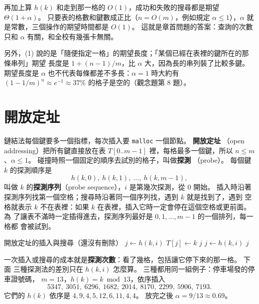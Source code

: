再加上算 $h(k)$ 和走到那一格的 $O(1)$，成功和失敗的搜尋都是期望 $\Theta(1 +
\alpha)$。 只要表的格數和鍵數成正比（$n = O(m)$，例如規定 $\alpha \le 1$），$\alpha$
就是常數，三個操作的期望時間都是 $O(1)$。 這就是章首問題的答案：查詢的次數只和
$\alpha$ 有關，和全校有幾張卡無關。

另外，(1) 說的是「隨便指定一格」的期望長度；「某個已經在表裡的鍵所在的那條串列」期望
長度是 $1 + (n-1)/m$，比 $\alpha$ 大，因為長的串列裝了比較多鍵。 期望長度是
$\alpha$ 也不代表每條都差不多長：$\alpha = 1$ 時大約有 $(1 - 1/m)^n \approx e^{-1}
\approx 37\%$ 的格子是空的（觀念題第 8 題）。

\section{開放定址}
\label{sec:hash-open}

鏈結法每個鍵要多一個指標，每次插入要 \texttt{malloc} 一個節點。 \textbf{開放定址}
（open addressing）把所有鍵直接放在表 $T[0..m-1]$ 裡，每格最多一個鍵，所以
$n \le m$、$\alpha \le 1$。 碰撞時照一個固定的順序去試別的格子，叫做\textbf{探測}
（probe）。 每個鍵 $k$ 的探測順序是
\[
h(k, 0),\ h(k, 1),\ \ldots,\ h(k, m - 1),
\]
叫做 $k$ 的\textbf{探測序列}（probe sequence），$i$ 是第幾次探測，從 $0$ 開始。
插入時沿著探測序列找第一個空格；搜尋時沿著同一個序列找，遇到 $k$ 就是找到了，遇到
空格就表示 $k$ 不在表裡：如果 $k$ 在表裡，插入它時一定會停在這個空格或更前面。 為
了讓表不滿時一定插得進去，探測序列最好是 $0, 1, \ldots, m-1$ 的一個排列，每一格都
會被試到。

\begin{pseudo}[label=alg:hash-open]{開放定址的插入與搜尋（還沒有刪除）}
        \State $j \gets h(k, i)$
            \State $T[j] \gets k$
            \State \Return $j$
        \EndIf
    \EndFor
    \State {}
\EndFunction
{}
        \State $j \gets h(k, i)$
            \State \Return $j$
            \State \Return \NIL
        \EndIf
    \EndFor
    \State \Return \NIL
\EndFunction
\end{pseudo}

一次插入或搜尋的成本就是\textbf{探測次數}：看了幾格，包括讓它停下來的那一格。 下面
三種探測法的差別只在 $h(k, i)$ 怎麼算。 三種都用同一組例子：停車場發的停車證號碼，
$m = 13$，$h(k) = k \bmod 13$，依序插入
\[
5347,\ 3051,\ 6296,\ 1682,\ 2014,\ 8170,\ 2299,\ 5906,\ 7193.
\]
它們的 $h(k)$ 依序是 $4, 9, 4, 5, 12, 6, 11, 4, 4$。 放完之後
$\alpha = 9/13 \approx 0.69$。

